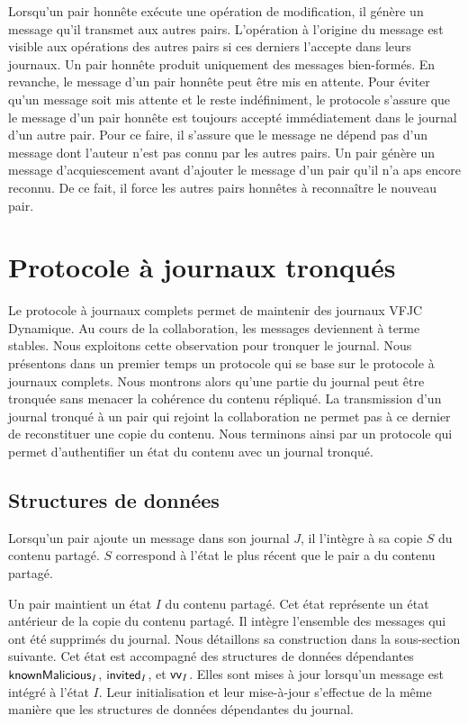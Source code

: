 Lorsqu'un pair honnête exécute une opération de modification, il génère un message qu'il transmet aux autres pairs.
L'opération à l'origine du message est visible aux opérations des autres pairs si ces derniers l'accepte dans leurs journaux.
Un pair honnête produit uniquement des messages bien-formés.
En revanche, le message d'un pair honnête peut être mis en attente.
Pour éviter qu'un message soit mis attente et le reste indéfiniment, le protocole s'assure que le message d'un pair honnête est toujours accepté immédiatement dans le journal d'un autre pair.
Pour ce faire, il s'assure que le message ne dépend pas d'un message dont l'auteur n'est pas connu par les autres pairs.
Un pair génère un message d'acquiescement avant d'ajouter le message d'un pair qu'il n'a aps encore reconnu.
De ce fait, il force les autres pairs honnêtes à reconnaître le nouveau pair.

\clearpage

\section{Protocole à journaux tronqués}\label{sec:pruned-log-protocol}

Le protocole à journaux complets permet de maintenir des journaux \acl{VFJC} Dynamique.
Au cours de la collaboration, les messages deviennent à terme stables.
Nous exploitons cette observation pour tronquer le journal.
Nous présentons dans un premier temps un protocole qui se base sur le protocole à journaux complets.
Nous montrons alors qu'une partie du journal peut être tronquée sans menacer la cohérence du contenu répliqué.
La transmission d'un journal tronqué à un pair qui rejoint la collaboration ne permet pas à ce dernier de reconstituer une copie du contenu.
Nous terminons ainsi par un protocole qui permet d'authentifier un état du contenu avec un journal tronqué.

\subsection{Structures de données}

Lorsqu'un pair ajoute un message dans son journal $J$, il l'intègre à sa copie $S$ du contenu partagé.
$S$ correspond à l'état le plus récent que le pair a du contenu partagé.


Un pair maintient un état $I$ du contenu partagé.
Cet état représente un état antérieur de la copie du contenu partagé.
Il intègre l'ensemble des messages qui ont été supprimés du journal.
Nous détaillons sa construction dans la sous-section suivante.
Cet état est accompagné des structures de données dépendantes $\operatorname{\mathsf{knownMalicious}}_I$, $\operatorname{\mathsf{invited}}_I$, et $\operatorname{\mathsf{vv}}_I$.
Elles sont mises à jour lorsqu'un message est intégré à l'état $I$.
Leur initialisation et leur mise-à-jour s'effectue de la même manière que les structures de données dépendantes du journal.

